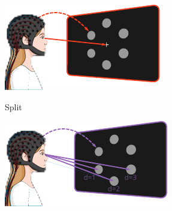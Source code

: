 \documentclass{kul-ulille-beamer}
\begin{document}
\begin{frame}
\begin{minipage}{.6\textwidth}
\begin{minipage}{.3\textwidth}
      \includegraphics[width=\textwidth]{figures/covert/attention_covert.pdf}
    \end{minipage}\hfill%
    \begin{minipage}{.3\textwidth}
      \small
      Split
      \smallskip

      \includegraphics[width=\textwidth]{figures/covert/attention_split.pdf}
    \end{minipage}%
    \end{minipage}

\end{frame}
\end{document}
